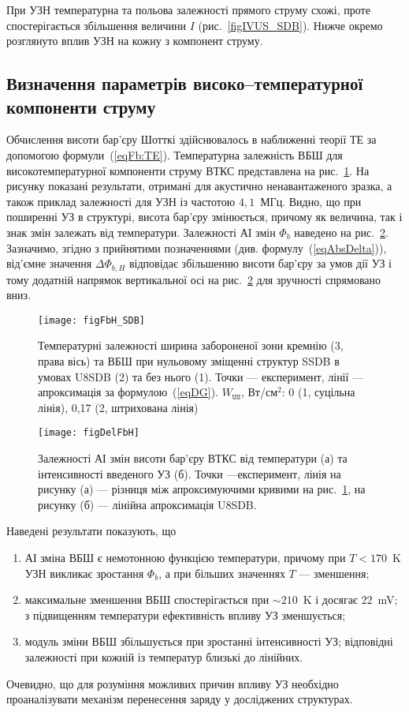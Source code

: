 При УЗН температурна та польова залежності прямого струму схожі,
проте спостерігається збільшення величини $I$ (рис.~\ref{figIVUS_SDB}).
Нижче окремо розглянуто вплив УЗН на кожну з компонент струму.


\subsection{Визначення параметрів високо--температурної компоненти струму}

Обчислення висоти бар'єру Шотткі здійснювалось в наближенні теорії ТЕ за допомогою формули~(\ref{eqFb:TE}).
Температурна залежність ВБШ для високотемпературної компоненти струму ВТКС представлена на рис.~\ref{figFbH_SDB}.
На рисунку показані результати, отримані для акустично ненавантаженого зразка,
а також приклад залежності для УЗН із частотою $4,1$~МГц.
Видно, що при поширенні УЗ в структурі, висота бар'єру змінюється,
причому як величина, так і знак змін залежать від температури.
Залежності АІ змін $\Phi_{b}$ наведено на рис.~\ref{figDelFbH}.
Зазначимо, згідно з прийнятими позначеннями (див. формулу~(\ref{eqAbsDelta})),
від'ємне значення $\Delta \Phi_{b,H}$ відповідає збільшенню висоти бар'єру за умов дії УЗ і тому
додатній напрямок вертикальної осі на рис.~\ref{figDelFbH} для зручності спрямовано вниз.



\begin{figure}[b]
\center
\texttt{[image: figFbH\_SDB]}
\caption{\label{figFbH_SDB}
Температурні залежності ширина забороненої зони кремнію (3, права вісь)
та ВБШ при нульовому зміщенні структур SSDB в умовах U8SDB (2) та без нього (1).
Точки --- експеримент,
лінії --- апроксимація за формулою~(\ref{eqDG}).
$W_\mathtt{US}$,  Вт/см$^2$: 0 (1, суцільна лінія), 0,17 (2, штрихована лінія)
}%
\end{figure}


\begin{figure}
\center
\texttt{[image: figDelFbH]}
\caption{\label{figDelFbH}
Залежності АІ змін висоти бар'єру ВТКС від температури (а) та інтенсивності введеного УЗ (б).
Точки ---експеримент,
лінія на рисунку (а) --- різниця між апроксимуючими кривими на рис.~\ref{figFbH_SDB},
на рисунку (б) --- лінійна апроксимація
U8SDB.
}%
\end{figure}

Наведені результати показують, що
\begin{enumerate}[label=\asbuk*),leftmargin=0em,itemindent=1.5em]
\item АІ зміна ВБШ є немотонною функцією температури, причому при $T<170$~K УЗН викликає зростання $\Phi_b$,
а при більших значеннях $T$ --- зменшення;
\item максимальне зменшення ВБШ спостерігається при $\sim210$~K і досягає 22~mV;
з підвищенням температури ефективність впливу УЗ зменшується;
\item модуль зміни ВБШ збільшується при зростанні інтенсивності УЗ; відповідні залежності при кожній із температур
близькі до лінійних.
\end{enumerate}
Очевидно, що для розуміння можливих причин впливу УЗ необхідно проаналізувати механізм перенесення заряду
у досліджених структурах.

